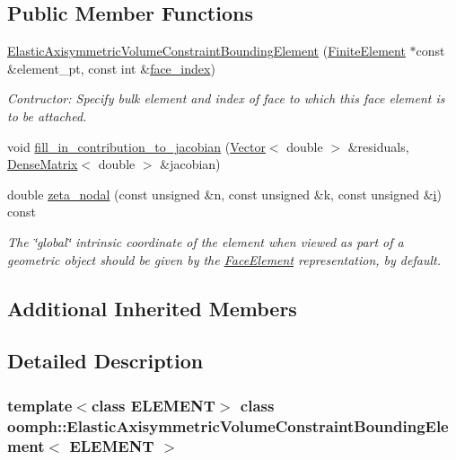 \subsection*{Public Member Functions}
\begin{DoxyCompactItemize}
\item 
\hyperlink{classoomph_1_1ElasticAxisymmetricVolumeConstraintBoundingElement_a533376e1f314fabc4c014f9c7547f5e8}{Elastic\+Axisymmetric\+Volume\+Constraint\+Bounding\+Element} (\hyperlink{classoomph_1_1FiniteElement}{Finite\+Element} $\ast$const \&element\+\_\+pt, const int \&\hyperlink{classoomph_1_1FaceElement_a478d577ac6db67ecc80f1f02ae3ab170}{face\+\_\+index})
\begin{DoxyCompactList}\small\item\em Contructor\+: Specify bulk element and index of face to which this face element is to be attached. \end{DoxyCompactList}\item 
void \hyperlink{classoomph_1_1ElasticAxisymmetricVolumeConstraintBoundingElement_adc7f5296f867251fe4b97b01f40c11e7}{fill\+\_\+in\+\_\+contribution\+\_\+to\+\_\+jacobian} (\hyperlink{classoomph_1_1Vector}{Vector}$<$ double $>$ \&residuals, \hyperlink{classoomph_1_1DenseMatrix}{Dense\+Matrix}$<$ double $>$ \&jacobian)
\item 
double \hyperlink{classoomph_1_1ElasticAxisymmetricVolumeConstraintBoundingElement_a8fe8843e542a626dd374cc4cd6850bcb}{zeta\+\_\+nodal} (const unsigned \&n, const unsigned \&k, const unsigned \&\hyperlink{cfortran_8h_adb50e893b86b3e55e751a42eab3cba82}{i}) const
\begin{DoxyCompactList}\small\item\em The \char`\"{}global\char`\"{} intrinsic coordinate of the element when viewed as part of a geometric object should be given by the \hyperlink{classoomph_1_1FaceElement}{Face\+Element} representation, by default. \end{DoxyCompactList}\end{DoxyCompactItemize}
\subsection*{Additional Inherited Members}


\subsection{Detailed Description}
\subsubsection*{template$<$class E\+L\+E\+M\+E\+NT$>$\newline
class oomph\+::\+Elastic\+Axisymmetric\+Volume\+Constraint\+Bounding\+Element$<$ E\+L\+E\+M\+E\+N\+T $>$}

